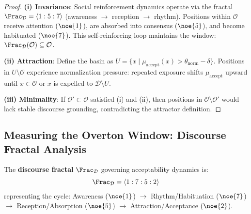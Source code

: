 \begin{proof}
\textbf{(i) Invariance}: Social reinforcement dynamics operate via the fractal
$\Frac_{\mathcal{D}} = \langle 1 : 5 : 7 \rangle$ (awareness $\to$ reception $\to$ rhythm).
Positions within $\mathcal{O}$ receive attention ($\noe{1}$), are absorbed into consensus
($\noe{5}$), and become habituated ($\noe{7}$). This self-reinforcing loop maintains the
window: $\Frac_{\mathcal{D}}(\mathcal{O}) \subseteq \mathcal{O}$.

\textbf{(ii) Attraction}: Define the basin as $U = \{x \mid \mu_{\mathrm{accept}}(x) >
\theta_{\mathrm{norm}} - \delta\}$. Positions in $U \setminus \mathcal{O}$ experience
normalization pressure: repeated exposure shifts $\mu_{\mathrm{accept}}$ upward until
$x \in \mathcal{O}$ or $x$ is expelled to $\mathcal{D} \setminus U$.

\textbf{(iii) Minimality}: If $\mathcal{O}' \subset \mathcal{O}$ satisfied (i) and (ii),
then positions in $\mathcal{O} \setminus \mathcal{O}'$ would lack stable discourse
grounding, contradicting the attractor definition.
\end{proof}

\subsection{Measuring the Overton Window: Discourse Fractal Analysis}

\begin{definition}
\label{def:discourse-fractal}
The \textbf{discourse fractal} $\Frac_{\mathcal{D}}$ governing acceptability dynamics is:
\[
    \Frac_{\mathcal{D}} = \langle 1 : 7 : 5 : 2 \rangle
\]
representing the cycle: Awareness ($\noe{1}$) $\to$ Rhythm/Habituation ($\noe{7}$)
$\to$ Reception/Absorption ($\noe{5}$) $\to$ Attraction/Acceptance ($\noe{2}$).
\end{definition}

